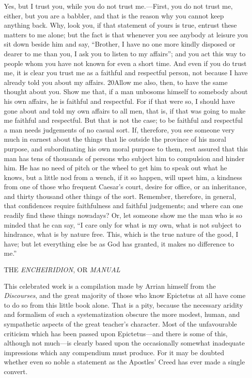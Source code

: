 Yes, but I trust you, while you do not trust me.—First, you do not trust me, either, but you are a babbler, and that is the reason why you cannot keep anything back. Why, look you, if that statement of yours is true, entrust these matters to me alone; but the fact is that whenever you see anybody at leisure you sit down beside him and say, ``Brother, I have no one more kindly disposed or dearer to me than you, I ask you to listen to my affairs''; and you act this way to people whom you have not known for even a short time. And even if you do trust me, it is clear you trust me as a faithful and respectful person, not because I have already told you about my affairs. 20Allow me also, then, to have the same thought about you. Show me that, if a man unbosoms himself to somebody about his own affairs, he is faithful and respectful. For if that were so, I should have gone about and told my own affairs to all men, that is, if that was going to make me faithful and respectful. But that is not the case; to be faithful and respectful a man needs judgements of no casual sort. If, therefore, you see someone very much in earnest about the things that lie outside the province of his moral purpose, and subordinating his own moral purpose to them, rest assured that this man has tens of thousands of persons who subject him to compulsion and hinder him. He has no need of pitch or the wheel to get him to speak out what he knows, but a little nod from a wench, if it so happen, will upset him, a kindness from one of those who frequent Caesar's court, desire for office, or an inheritance, and thirty thousand other things of the sort. Remember, therefore, in general, that confidences require faithfulness and faithful judgements; and where can one readily find these things nowadays? Or, let someone show me the man who is so minded that he can say, ``I care only for what is my own, what is not subject to hindrance, what is by nature free. This, which is the true nature of the good, I have; but let everything else be as God has granted, it makes no difference to me.''



THE \emph{ENCHEIRIDION}, OR \emph{MANUAL}

This celebrated work is a compilation made by Arrian himself from the \emph{Discourses}, and the great majority of those who know Epictetus at all have come to do so from this little book alone. That is a pity, because the necessary aridity and formalism of such a systematization obscure the more modest, human, and sympathetic aspects of the great teacher's character. Most of the unfavourable criticism which has been passed upon Epictetus—and there is some of this, although not much—is clearly based upon the occasionally somewhat inadequate impressions which any compendium must produce. For it may be doubted whether even so noble a statement as the Apostles' Creed has ever made a single convert.

